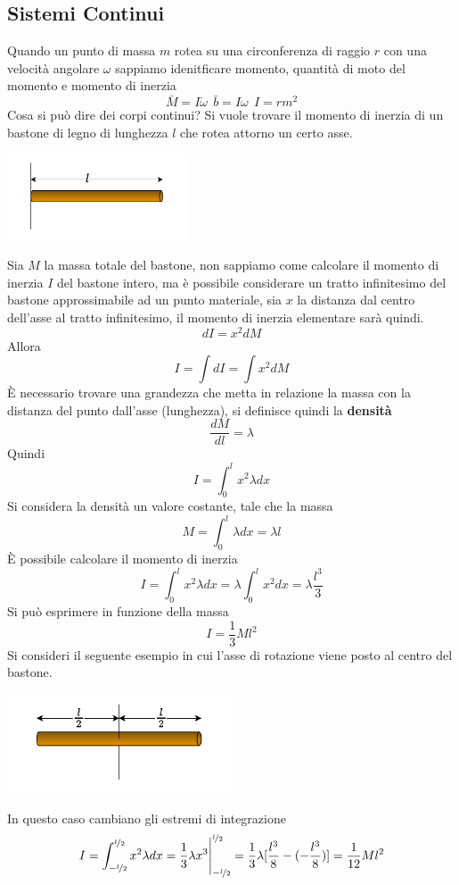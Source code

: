 \documentclass[10pt, letterpaper]{report}
\begin{document}
\subsection{Sistemi Continui}
Quando un punto di massa $m$ rotea su una  circonferenza di raggio $r$ con una velocità angolare $\omega$ 
sappiamo idenitficare momento, quantità di moto del momento e momento di inerzia 
$$ \bar M = I\dot{\omega} \ \ \bar b = I\omega \ \ I=rm^2$$
Cosa si può dire dei corpi continui? Si vuole trovare il momento di inerzia di un bastone di legno di lunghezza $l$ che rotea attorno un certo asse.
\begin{center}
    \includegraphics[width=0.4\textwidth ]{images/bastone.pdf}
\end{center}
Sia $M$ la massa totale del bastone, non sappiamo come calcolare il momento di inerzia $I$ del bastone intero, ma è possibile considerare un tratto infinitesimo del bastone approssimabile ad un punto materiale, sia $x$ la 
distanza dal centro dell'asse al tratto infinitesimo, il momento di inerzia elementare sarà quindi.
$$ dI=x^2dM$$
Allora 
$$ I=\int dI=\int x^2dM$$
È necessario trovare una grandezza che metta in relazione la massa con la distanza del punto dall'asse (lunghezza), si definisce quindi la \textbf{densità}
$$ \frac{dM}{dl}=\lambda$$
Quindi 
$$I=\int_0^lx^2\lambda dx $$
Si considera la densità un valore costante, tale che la massa 
$$ M=\int_0^l\lambda dx = \lambda l$$
È possibile calcolare il momento di inerzia 
$$I=\int_0^lx^2\lambda dx =\lambda\int_0^lx^2 dx =\lambda\frac{l^3}{3}$$
Si può esprimere in funzione della massa 
$$ I=\frac{1}{3}Ml^2$$
Si consideri il seguente esempio in cui l'asse di rotazione viene posto al centro del bastone.\begin{center}
    \includegraphics[width=0.5\textwidth ]{images/bastone2.pdf}
\end{center}
In questo caso cambiano gli estremi di integrazione 
$$ I=\int_{-\nicefrac{l}{2}}^{\nicefrac{l}{2}}x^2\lambda dx=\frac{1}{3}\lambda x^3\Bigg|_{-\nicefrac{l}{2}}^{\nicefrac{l}{2}}=\frac{1}{3}\lambda [\frac{l^3}{8}-(-\frac{l^3}{8})]= 
\frac{1}{12}Ml^2$$
\end{document}
